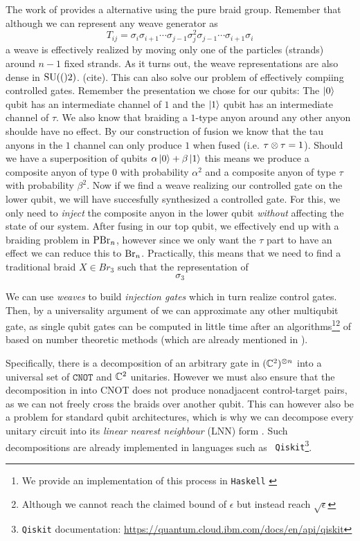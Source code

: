 The work of \textcite{simonTopologicalQuantumComputing2006a} provides a
alternative using the pure braid group. Remember that although we can represent
any weave generator as 
\[
  T_{ij} = \sigma_i \sigma_{i+1} \cdots \sigma_{j-1} \sigma_{j}^2 \sigma_{j-1} \cdots \sigma_{i+1} \sigma_i
\]
a weave is effectively realized by moving only one of the particles (strands)
around $n-1$ fixed strands. As it turns out, the weave representations are also
dense in $\mathrm{SU}(()2)$. (cite). This can also solve our problem of effectively
compiing controlled gates. Remember the presentation we chose for our qubits:
The $\left| 0 \right\rangle$ qubit has an intermediate channel of $1$ and the $\left| 1 \right\rangle$ qubit
has an intermediate channel of $\tau$. We also know that braiding a $1$-type
anyon around any other anyon shoulde have no effect. By our construction of
fusion we know that the tau anyons in the $1$ channel can only produce $1$ when
fused (i.e. $\tau \otimes \tau = 1$). Should we have a superposition of qubits
$\alpha \left| 0 \right\rangle + \beta \left| 1 \right\rangle$ this means we produce a composite anyon of type
$0$ with probability $\alpha^2$ and a composite anyon of type $\tau$ with
probability $\beta^2$. Now if we find a weave realizing our controlled gate on
the lower qubit, we will have succesfully synthesized a controlled gate. For
this, we only need to \emph{inject} the composite anyon in the lower qubit
\emph{without} affecting the state of our system.
After fusing in our top qubit, we effectively end up with a braiding problem in
$ \mathrm{PBr}_n$, however since we only want the $\tau$ part to have an effect we can
reduce this to $\mathrm{Br}_n$. Practically, this means that we need to find a
traditional braid $X \in Br_3$ such that the representation of 
\[
  \sigma_3
\]

We can use \emph{weaves} to build \emph{injection gates} which in
turn realize control gates. Then, by a universality argument of
\cite{freedmanModularFunctorWhich2000a} we can approximate any other multiqubit
gate, as single qubit gates can be computed in little time after an
algorithms\footnote{We provide an implementation of this process in
\texttt{Haskell} \cite{jeremiasJkr11Exactsynthhs2025} }\footnote{Although we
cannot reach the claimed bound of $\epsilon$ but instead reach
$\sqrt{\epsilon}$} of \cite{kliuchnikovAsymptoticallyOptimalTopological2013}
based on number theoretic methods (which are already mentioned in
\cite{freedmanLargeFourierTransforms2007}).

Specifically, there is a decomposition of an arbitrary gate in $(\mathbb{C}^{2})^{\otimes
n}$ into a universal set of $\texttt{CNOT}$ and $\mathbb{C}^2$ unitaries. 
However we must also ensure that the decomposition in into CNOT does not produce
nonadjacent control-target pairs, as we can not freely cross the braids over
another qubit. This can however also be a problem for standard qubit
architectures, which is why we can decompose every unitary circuit into its
\emph{linear nearest neighbour} (LNN) form
\cite{kutinComputationDistance2007,saeediSynthesisQuantumCircuits2011}. Such
decompositions are already implemented in languages such as {\tt
Qiskit}\footnote{{\tt Qiskit} documentation:
\url{https://quantum.cloud.ibm.com/docs/en/api/qiskit}}\cite{javadiabhari2024quantum}.

